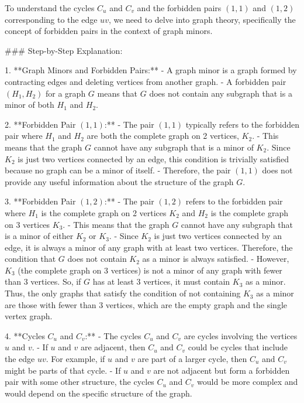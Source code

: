To understand the cycles \( C_u \) and \( C_v \) and the forbidden pairs \((1,1)\) and \((1,2)\) corresponding to the edge \( uv \), we need to delve into graph theory, specifically the concept of forbidden pairs in the context of graph minors.

### Step-by-Step Explanation:

1. **Graph Minors and Forbidden Pairs:**
   - A graph minor is a graph formed by contracting edges and deleting vertices from another graph.
   - A forbidden pair \((H_1, H_2)\) for a graph \(G\) means that \(G\) does not contain any subgraph that is a minor of both \(H_1\) and \(H_2\).

2. **Forbidden Pair \((1,1)\):**
   - The pair \((1,1)\) typically refers to the forbidden pair where \(H_1\) and \(H_2\) are both the complete graph on 2 vertices, \(K_2\).
   - This means that the graph \(G\) cannot have any subgraph that is a minor of \(K_2\). Since \(K_2\) is just two vertices connected by an edge, this condition is trivially satisfied because no graph can be a minor of itself.
   - Therefore, the pair \((1,1)\) does not provide any useful information about the structure of the graph \(G\).

3. **Forbidden Pair \((1,2)\):**
   - The pair \((1,2)\) refers to the forbidden pair where \(H_1\) is the complete graph on 2 vertices \(K_2\) and \(H_2\) is the complete graph on 3 vertices \(K_3\).
   - This means that the graph \(G\) cannot have any subgraph that is a minor of either \(K_2\) or \(K_3\).
   - Since \(K_2\) is just two vertices connected by an edge, it is always a minor of any graph with at least two vertices. Therefore, the condition that \(G\) does not contain \(K_2\) as a minor is always satisfied.
   - However, \(K_3\) (the complete graph on 3 vertices) is not a minor of any graph with fewer than 3 vertices. So, if \(G\) has at least 3 vertices, it must contain \(K_3\) as a minor. Thus, the only graphs that satisfy the condition of not containing \(K_3\) as a minor are those with fewer than 3 vertices, which are the empty graph and the single vertex graph.

4. **Cycles \(C_u\) and \(C_v\):**
   - The cycles \(C_u\) and \(C_v\) are cycles involving the vertices \(u\) and \(v\).
   - If \(u\) and \(v\) are adjacent, then \(C_u\) and \(C_v\) could be cycles that include the edge \(uv\). For example, if \(u\) and \(v\) are part of a larger cycle, then \(C_u\) and \(C_v\) might be parts of that cycle.
   - If \(u\) and \(v\) are not adjacent but form a forbidden pair with some other structure, the cycles \(C_u\) and \(C_v\) would be more complex and would depend on the specific structure of the graph.


